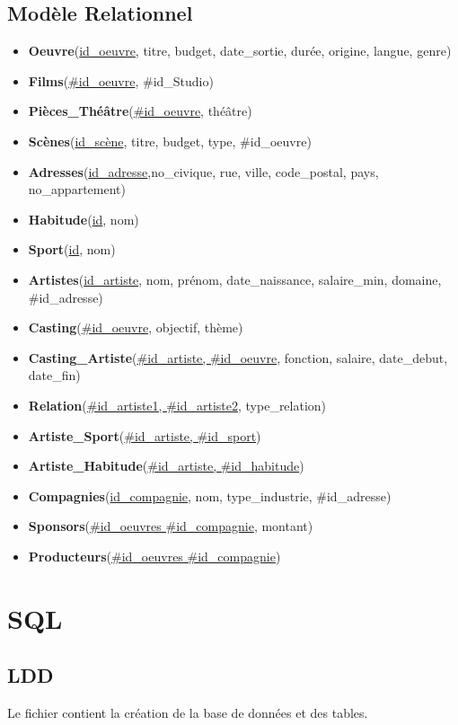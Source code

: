 \documentclass{article}
\begin{document}
\subsection{Modèle Relationnel}
\begin{itemize}
\item \textbf{Oeuvre}(\underline{id\_oeuvre}, titre, budget,
  date\_sortie, durée, origine, langue, genre)
  
\item \textbf{Films}(\underline{\#id\_oeuvre}, \#id\_Studio)
  
\item \textbf{Pièces\_Théâtre}(\underline{\#id\_oeuvre}, théâtre)
  
\item \textbf{Scènes}(\underline{id\_scène}, titre, budget, type,
  \#id\_oeuvre)
  
\item \textbf{Adresses}(\underline{id\_adresse},no\_civique, rue,
  ville, code\_postal, pays, no\_appartement)

\item \textbf{Habitude}(\underline{id}, nom)

\item \textbf{Sport}(\underline{id}, nom)
  
\item \textbf{Artistes}(\underline{id\_artiste}, nom, prénom,
  date\_naissance, salaire\_min, domaine, \#id\_adresse)
  
\item \textbf{Casting}(\underline{\#id\_oeuvre}, objectif, thème)

\item \textbf{Casting\_Artiste}(\underline{\#id\_artiste, \#id\_oeuvre}, fonction,
  salaire, date\_debut, date\_fin)

\item \textbf{Relation}(\underline{\#id\_artiste1, \#id\_artiste2}, type\_relation)

\item \textbf{Artiste\_Sport}(\underline{\#id\_artiste, \#id\_sport})

\item \textbf{Artiste\_Habitude}(\underline{\#id\_artiste, \#id\_habitude})

\item \textbf{Compagnies}(\underline{id\_compagnie}, nom,
  type\_industrie, \#id\_adresse)
  
\item \textbf{Sponsors}(\underline{\#id\_oeuvres \#id\_compagnie},
  montant)
  
\item \textbf{Producteurs}(\underline{\#id\_oeuvres
    \#id\_compagnie})
  

\end{itemize}

\vspace{5mm}
\section{SQL}
\subsection{LDD}
Le fichier \href{https://github.com/ZGaillard/projet_session_2935/blob/main/database/create.sql}{} contient la création de la base de données et des tables.
\end{document}
